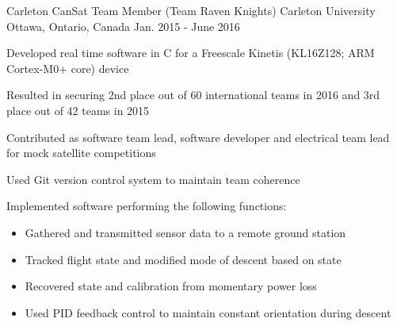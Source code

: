 

\begin{cventries}

  \cventry
    {Carleton CanSat Team Member (Team Raven Knights)} %
    {Carleton University} %
    {Ottawa, Ontario, Canada} %
    {Jan. 2015 - June 2016} %
    {
      \begin{cvitems} %
        \item {Developed real time software in C for a Freescale Kinetis (KL16Z128; ARM Cortex-M0+ core) device}
        \item {Resulted in securing 2nd place out of 60 international teams in 2016 and 3rd place out of 42 teams in 2015}
        \item {Contributed as software team lead, software developer and electrical team lead for mock satellite competitions}
        \item {Used Git version control system to maintain team coherence}
        \item {Implemented software performing the following functions:}
        \begin{itemize}
          \item {Gathered and transmitted sensor data to a remote ground station}
          \item {Tracked flight state and modified mode of descent based on state}
          \item {Recovered state and calibration from momentary power loss}
          \item {Used PID feedback control to maintain constant orientation during descent}
        \end{itemize}
      \end{cvitems}
    }

\end{cventries}
